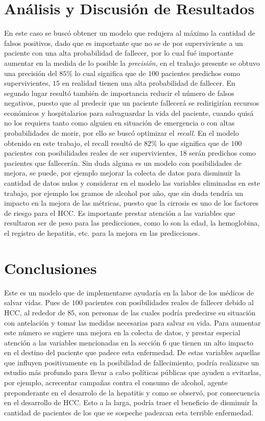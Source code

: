 \documentclass[6pt, twocolumn]{article}
\begin{document}
\section{Análisis y Discusión de Resultados}
En este caso se buscó obtener un modelo que redujera al máximo la cantidad de falsos positivos, dado que es importante que no se de por superviviente a un paciente con una alta probabilidad de fallecer, por lo cual fué importante aumentar en la medida de lo posible la \textit{precisión}, en el trabajo presente se obtuvo una precisión del $85\%$ lo cual significa que de $100$ pacientes predichos como supervivientes, $15$ en realidad tienen una alta probabilidad de fallecer. En segundo lugar resultó también de importancia reducir el número de falsos negativos, puesto que al predecir que un paciente fallecerá se redirigirían recursos económicos y hospitalarios para salvaguardar la vida del paciente, cuando quisá no los requiera tanto como alguien en situación de emergencia o con altas probabilidades de morir, por ello se buscó optimizar el \textit{recall}. En el modelo obtenido en este trabajo, el recall resultó de $82\%$ lo que significa que de $100$ pacientes con posibilidades reales de ser supervivientes, $18$ serán predichos como pacientes que fallecerán. Sin duda alguna es un modelo con posibilidades de mejora, se puede, por ejemplo mejorar la colecta de datos para disminuir la cantidad de datos nulos y considerar en el modelo las variables eliminadas en este trabajo, por ejemplo los gramos de alcohol por a\~no, que sin duda tendría un impacto en la mejora de las métricas, puesto que la cirrosis es uno de los factores de riesgo para el HCC. Es importante prestar atención a las variables que resultaron ser de peso para las predicciones, como lo son la edad, la hemoglobina, el registro de hepatitis, etc. para la mejora en las predicciones.

\section{Conclusiones}
Este es un modelo que de implementarse ayudaría en la labor de los médicos de salvar vidas. Pues de $100$ pacientes con posibilidades reales de fallecer debido al HCC, al rededor de $85$, son personas de las cuales podría predecirse su situación con antelación y tomar las medidas necesarias para salvar su vida. Para aumentar este número se sugiere una mejora en la colecta de datos, y prestar especial atención a las variables mencionadas en la sección 6 que tienen un alto impacto en el destino del paciente que padece esta enfermedad. De estas variables aquellas que influyen positivamente en la posibilidad de fallecimiento, podría realizarse un estudio más profundo para llevar a cabo políticas públicas que ayuden a evitarlas, por ejemplo, acrecentar campañas contra el consumo de alcohol, agente preponderante en el desarrolo de la hepatitis y como se observó, por consecuencia en el desarrollo de HCC. Esto a la larga, podría traer el beneficio de disminuir la cantidad de pacientes de los que se sospeche padezcan esta terrible enfermedad.
\end{document}
